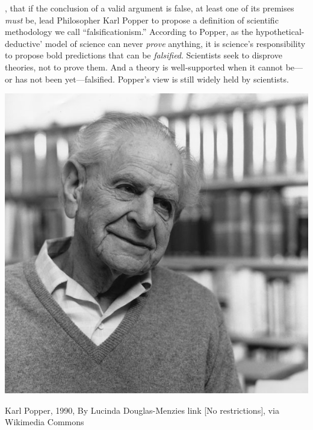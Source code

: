 \begin{refsection}
, that if the conclusion of a valid argument is false, at least one of its premises \emph{must} be, lead Philosopher Karl Popper to propose a definition of scientific methodology we call “falsificationism.” According to Popper, as the hypothetical-deductive’ model of science can never \emph{prove} anything, it is science’s responsibility to propose bold predictions that can be \emph{falsified}. Scientists seek to disprove theories, not to prove them. And a theory is well-supported when it cannot be---or has not been yet---falsified. Popper’s view is still widely held by scientists. \begin{marginfigure}
 \begin{center}
     \includegraphics[scale=0.50]{../images/Karl_Popper2.jpg}
\end{center}
 \caption{Karl Popper, 1990, By Lucinda Douglas-Menzies  link [No restrictions], via Wikimedia Commons
}
\label{fig: karlpopper}
\end{marginfigure} 


\end{refsection}
